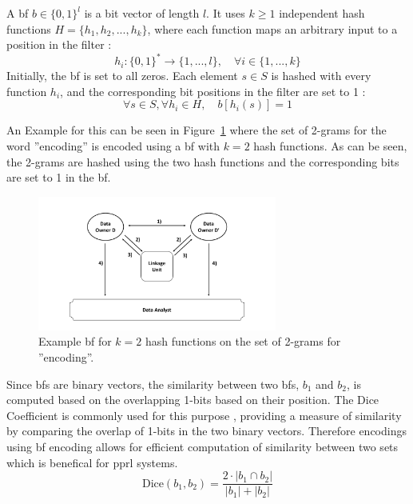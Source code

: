 A \ac{bf} $b \in \{0,1\}^l$ is a bit vector of length $l$.
It uses $k \geq 1$ independent hash functions $H = \{h_1, h_2, ..., h_k\}$, where each function maps an arbitrary input to a position in the filter \cite{schaefer2024,schnell2009privacy}:
\begin{equation}
  h_i: \{0,1\}^* \to \{1, ..., l\}, \quad \forall i \in \{1, ..., k\}
\end{equation}
Initially, the \ac{bf} is set to all zeros.
Each element $s \in S$ is hashed with every function $h_i$, and the corresponding bit positions in the filter are set to 1 \cite{schaefer2024,schnell2009privacy}:
\begin{equation}
  \forall s \in S, \forall h_i \in H, \quad b[h_i(s)] = 1
\end{equation}

An Example for this can be seen in Figure~\ref{fig:bfexample} where the set of 2-grams for the word ''encoding'' is encoded using a \ac{bf} with $k = 2$ hash functions. As can be seen, the 2-grams are hashed using the two hash functions and the corresponding bits are set to 1 in the \ac{bf}.

\begin{figure}[H]
  \centering
  \includegraphics[width=0.7\textwidth, page=5]{img/visualization.pdf}
  \caption{Example \ac{bf} for $k = 2$ hash functions on the set of 2-grams for ''encoding''.}
  \label{fig:bfexample}
\end{figure}

Since \ac{bf}s are binary vectors, the similarity between two \ac{bf}s, \(b_1\) and \(b_2\), is computed based on the overlapping 1-bits based on their position.
The Dice Coefficient is commonly used for this purpose \cite{schaefer2024}, providing a measure of similarity by comparing the overlap of 1-bits in the two binary vectors.
Therefore encodings using \ac{bf} encoding allows for efficient computation of similarity between two sets which is benefical for \ac{pprl} systems.
\begin{equation}
  \text{Dice}(b_1, b_2) = \frac{2 \cdot |b_1 \cap b_2|}{|b_1| + |b_2|}
\end{equation}

